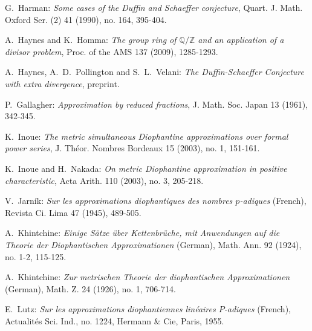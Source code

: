 \documentclass[12pt,reqno]{amsart}
\begin{document}
\begin{thebibliography}{1}
G.~Harman: \emph{Some cases of the Duffin and Schaeffer conjecture}, Quart. J. Math. Oxford Ser. (2) 41 (1990), no. 164, 395-404.

\vspace*{1ex}

A.~Haynes and K.~Homma: \emph{The group ring of ${\mathbb{Q}}/{\mathbb{Z}}$ and an application of a divisor problem}, Proc. of the AMS 137 (2009), 1285-1293.

\vspace*{1ex}

A.~Haynes, A.~D.~Pollington and S.~L.~Velani: \emph{The Duffin-Schaeffer Conjecture with extra divergence}, preprint.

\vspace*{1ex}

P.~Gallagher: \emph{Approximation by reduced fractions}, J. Math. Soc. Japan 13 (1961), 342-345.

\vspace*{1ex}

K.~Inoue: \emph{The metric simultaneous Diophantine approximations over formal power series}, J. Th\'{e}or. Nombres Bordeaux 15 (2003), no. 1, 151-161.

\vspace*{1ex}

K.~Inoue and H.~Nakada: \emph{On metric Diophantine approximation in positive characteristic}, Acta Arith. 110 (2003), no. 3, 205-218.
\vspace*{1ex}

V.~Jarn\'{i}k: \emph{Sur les approximations diophantiques des nombres $p$-adiques} (French), Revista Ci. Lima 47 (1945), 489-505.
\vspace*{1ex}

A.~Khintchine: \emph{Einige S\"{a}tze \"{u}ber Kettenbr\"{u}che, mit Anwendungen auf die Theorie der Diophantischen Approximationen} (German), Math. Ann. 92 (1924), no. 1-2, 115-125.

\vspace*{1ex}

A.~Khintchine: \emph{Zur metrischen Theorie der diophantischen Approximationen} (German), Math. Z. 24 (1926), no. 1, 706-714.

\vspace*{1ex}

E.~Lutz: \emph{Sur les approximations diophantiennes lin\'{e}aires $P$-adiques} (French), Actualit\'{e}s Sci. Ind., no. 1224, Hermann \& Cie, Paris, 1955.
\vspace*{1ex}


\end{thebibliography}
\end{document}
